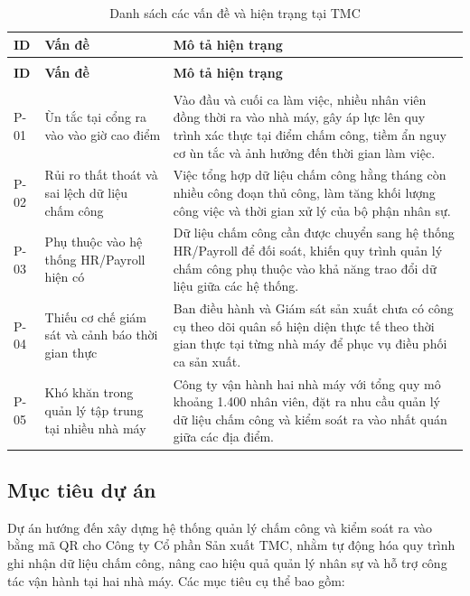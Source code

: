 \begingroup
\small
\renewcommand{\arraystretch}{1.2}
\begin{longtable}{|>{\centering\arraybackslash}m{1.5cm}|m{4.2cm}|m{10cm}|}
    \caption{Danh sách các vấn đề và hiện trạng tại TMC}\label{tab:problems-current-state}\\
    \hline
    \textbf{ID} & \textbf{Vấn đề} & \textbf{Mô tả hiện trạng}\\
    \hline
    \endfirsthead
    \multicolumn{3}{c}{\tablename\ \thetable{} -- tiếp theo}\\
    \hline
    \textbf{ID} & \textbf{Vấn đề} & \textbf{Mô tả hiện trạng}\\
    \hline
    \endhead
    \hline
    \multicolumn{3}{r}{(Còn tiếp)}\\
    \endfoot
    \hline
    \endlastfoot
    P-01 & Ùn tắc tại cổng ra vào vào giờ cao điểm & Vào đầu và cuối ca làm việc, nhiều nhân viên đồng thời ra vào nhà máy, gây áp lực lên quy trình xác thực tại điểm chấm công, tiềm ẩn nguy cơ ùn tắc và ảnh hưởng đến thời gian làm việc.\\
    \hline
    P-02 & Rủi ro thất thoát và sai lệch dữ liệu chấm công & Việc tổng hợp dữ liệu chấm công hằng tháng còn nhiều công đoạn thủ công, làm tăng khối lượng công việc và thời gian xử lý của bộ phận nhân sự.\\
    \hline
    P-03 & Phụ thuộc vào hệ thống HR/Payroll hiện có & Dữ liệu chấm công cần được chuyển sang hệ thống HR/Payroll để đối soát, khiến quy trình quản lý chấm công phụ thuộc vào khả năng trao đổi dữ liệu giữa các hệ thống.\\
    \hline
    P-04 & Thiếu cơ chế giám sát và cảnh báo thời gian thực & Ban điều hành và Giám sát sản xuất chưa có công cụ theo dõi quân số hiện diện thực tế theo thời gian thực tại từng nhà máy để phục vụ điều phối ca sản xuất.\\
    \hline
    P-05 & Khó khăn trong quản lý tập trung tại nhiều nhà máy & Công ty vận hành hai nhà máy với tổng quy mô khoảng 1.400 nhân viên, đặt ra nhu cầu quản lý dữ liệu chấm công và kiểm soát ra vào nhất quán giữa các địa điểm.\\
    \hline
\end{longtable}
\endgroup

\subsection{Mục tiêu dự án}
Dự án hướng đến xây dựng hệ thống quản lý chấm công và kiểm soát ra vào bằng mã QR cho Công ty Cổ phần Sản xuất TMC, nhằm tự động hóa quy trình ghi nhận dữ liệu chấm công, nâng cao hiệu quả quản lý nhân sự và hỗ trợ công tác vận hành tại hai nhà máy. Các mục tiêu cụ thể bao gồm:

